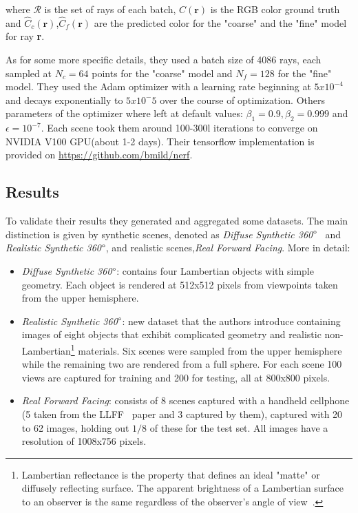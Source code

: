 where $\mathcal{R}$ is the set of rays of each batch, $C(\textbf{r})$ is the RGB color
ground truth and $\hat{C}_c(\textbf{r})$,$\hat{C}_f(\textbf{r})$ are the predicted color
for the "coarse" and the "fine" model for ray \textbf{r}.

As for some more specific details, they used a batch size of 4086 rays, each
sampled at $N_c=64$ points for the "coarse" model and $N_f=128$ for the "fine"
model. They used the Adam optimizer with a learning rate beginning at $5x10^{-4}$
and decays exponentially to $5x10^-5$ over the course of optimization. Others parameters
of the optimizer where left at default values: $\beta_1 = 0.9,\beta_2=0.999$ and $\epsilon=10^{-7}$.
Each scene took them around 100-300l iterations to converge on NVIDIA V100 GPU(about 1-2 days).
Their tensorflow implementation is provided on \url{https://github.com/bmild/nerf}.

\subsection{Results}
To validate their results they generated and aggregated some datasets.
The main distinction is given by synthetic scenes, denoted as\textit{ Diffuse 
Synthetic 360$\degree$}~\cite{deepvoxels} and \textit{Realistic Synthetic 360$\degree$}, and 
realistic scenes,\textit{Real Forward Facing}. More in detail:
\begin{itemize}
    \item \textit{ Diffuse Synthetic 360$\degree$}: contains four Lambertian objects 
    with simple geometry. Each object is rendered at 512x512 pixels from viewpoints taken
    from the upper hemisphere.
    \item \textit{ Realistic Synthetic 360$\degree$}: new dataset that the authors introduce
    containing images of eight objects that exhibit complicated geometry and realistic non-Lambertian\footnote{Lambertian reflectance is the property that defines an ideal "matte" or diffusely reflecting surface. The apparent brightness of a Lambertian surface to an observer is the same regardless of the observer's angle of view~\cite{lambertian}.}
    materials. Six scenes were sampled from the upper hemisphere while the remaining two
    are rendered from a full sphere. For each scene 100 views are captured for training and 
    200 for testing, all at 800x800 pixels.
    \item \textit{Real Forward Facing}: consists of 8 scenes captured with a handheld cellphone
    (5 taken from the LLFF~\cite{LLFF} paper and 3 captured by them), captured with 20 to 62 images,
    holding out $1/8$ of these for the test set. All images have a resolution of 1008x756 pixels.
\end{itemize}

